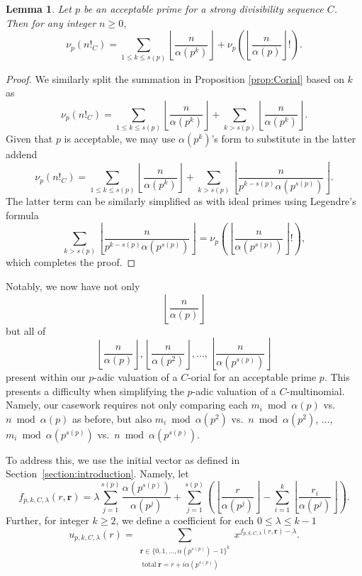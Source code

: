 \documentclass{amsart}
\newtheorem{lemma}[theorem]{Lemma}
\theoremstyle{definition}
\DeclareMathOperator{\total}{total}
\begin{document}
\begin{lemma}
\label{lemma:acceptableCorial}
Let $ p $ be an acceptable prime for a strong divisibility sequence $ C $. Then for any integer $ n \geq 0 $,
\[
\nu_p(n!_C) = \sum_{1\leq k\leq s(p)} \left\lfloor \frac{n}{\alpha(p^k)} \right\rfloor + \nu_p\left( \left\lfloor \frac{n}{\alpha(p)} \right\rfloor ! \right).
\]
\end{lemma}

\begin{proof}
We similarly split the summation in Proposition \ref{prop:Corial} based on $k$ as $$\nu_p\left(n!_C\right) = \sum_{1\leq k \leq s(p)} \left\lfloor\frac{n}{\alpha(p^k)}\right\rfloor + \sum_{k > s(p)} \left\lfloor\frac{n}{\alpha(p^k)}\right\rfloor.$$
Given that $p$ is acceptable, we may use $\alpha(p^k)$'s form to substitute in the latter addend
$$\nu_p\left(n!_C\right) = \sum_{1\leq k \leq s(p)} \left\lfloor\frac{n}{\alpha(p^k)}\right\rfloor + \sum_{k > s(p)} \left\lfloor\frac{n}{p^{k-s(p)} \alpha(p^{s(p)})}\right\rfloor.$$
The latter term can be similarly simplified as with ideal primes using Legendre's formula  
$$\sum\limits_{k > s(p)} \left\lfloor\frac{n}{p^{k-s(p)} \alpha(p^{s(p)})}\right\rfloor = \nu_p\left(\left\lfloor\frac{n}{\alpha(p^{s(p)})}\right\rfloor!\right),$$
which completes the proof.
\end{proof}

Notably, we now have not only $$\left\lfloor\frac{n}{\alpha(p)}\right\rfloor$$ but all of $$\left\lfloor\frac{n}{\alpha(p)}\right\rfloor, \left\lfloor\frac{n}{\alpha(p^{2})}\right\rfloor, \ldots, \left\lfloor\frac{n}{\alpha(p^{s(p)})}\right\rfloor$$
present within our $p$-adic valuation of a $C$-orial for an acceptable prime $p$.
This presents a difficulty when simplifying the $p$-adic valuation of a $C$-multinomial. Namely, our casework requires not only comparing each $m_i \bmod \alpha(p)$ vs.\ $n \bmod \alpha(p)$
as before, but also 
$m_i \bmod \alpha(p^2)$ vs.\ $n \bmod \alpha(p^2)$, $\ldots$, $m_i \bmod \alpha(p^{s(p)})$ vs.\ $n \bmod \alpha(p^{s(p)})$.

To address this, we use the initial vector as defined in Section~\ref{section:introduction}. Namely, let
\[
f_{p,k,C,\lambda}(r,\mathbf{r})=\lambda\sum_{j=1}^{s(p)}\frac{\alpha(p^{s(p)})}{\alpha(p^{j})} + \sum_{j=1}^{s(p)}\left( \left\lfloor\frac{r}{\alpha(p^{j})} \right\rfloor - \sum_{i=1}^k\left\lfloor\frac{r_i}{\alpha(p^{j})} \right\rfloor \right).
\]  
Further, for integer $k \geq 2$, we define a coefficient for each $0 \leq \lambda\leq k-1$
$$u_{p,k,C,\lambda}(r)=\sum_{\substack{
\mathbf{r}\in \{0, 1, \ldots,\alpha(p^{s(p)})-1\}^k \\ 
\total\mathbf{r}
= r+i\alpha(p^{s(p)})}}x^{f_{p,k,C,\lambda}(r, \mathbf{r})-\lambda}.$$
\end{document}
